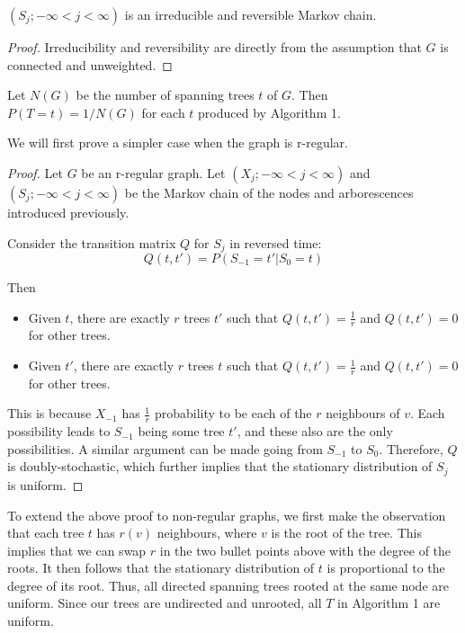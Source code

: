 \begin{proposition}
   $(S_j; -\infty < j < \infty)$ is an irreducible and reversible Markov chain. 
\end{proposition}

\begin{proof}
Irreducibility and reversibility are directly from the assumption that $G$ is connected and unweighted. 
\end{proof}


\begin{theorem}
    Let $N(G)$ be the number of spanning trees $t$ of $G$. Then
$P(T = t) = 1/N(G)$ for each $t$ produced by Algorithm 1.
\end{theorem} 

We will first prove a simpler case when the graph is r-regular. 


\begin{proof}
    Let $G$ be an r-regular graph. Let $(X_j; -\infty < j < \infty)$ and $(S_j; -\infty < j < \infty)$ be the Markov chain of the nodes and arborescences introduced previously. 

Consider the transition matrix $Q$ for $S_j$ in reversed time:
$$Q(t, t') = P(S_{-1} = t' | S_0 = t)$$

Then
\begin{itemize}
    \item Given $t$, there are exactly $r$ trees $t'$ such that $Q(t, t') = \frac{1}{r}$ and $Q(t, t') = 0$ for other trees. 
    \item Given $t'$, there are exactly $r$ trees $t$ such that $Q(t, t') = \frac{1}{r}$ and $Q(t, t') = 0$ for other trees. 
\end{itemize}

This is because $X_{-1}$ has $\frac{1}{r}$ probability to be each of the $r$ neighbours of $v$. Each possibility leads to $S_{-1}$ being some tree $t'$, and these also are the only possibilities. A similar argument can be made going from $S_{-1}$ to $S_0$. Therefore, $Q$ is doubly-stochastic, which further implies that the stationary distribution of $S_j$ is uniform. 
\end{proof}

To extend the above proof to non-regular graphs, we first make the observation that each tree $t$ has $r(v)$ neighbours, where $v$ is the root of the tree. This implies that we can swap $r$ in the two bullet points above with the degree of the roots. It then follows that the stationary distribution of $t$ is proportional to the degree of its root. Thus, all directed spanning trees rooted at the same node are uniform. Since our trees are undirected and unrooted, all $T$ in Algorithm 1 are uniform. 